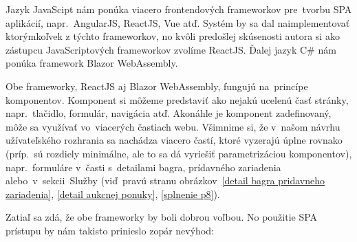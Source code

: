 Jazyk JavaScipt nám ponúka viacero frontendových frameworkov pre~tvorbu SPA aplikácií, napr.~AngularJS, ReactJS, Vue atď. Systém by sa dal naimplementovať ktorýmkoľvek z týchto frameworkov, no kvôli predošlej skúsenosti autora si ako zástupcu JavaScriptových frameworkov zvolíme ReactJS. Ďalej jazyk C\# nám ponúka framework Blazor WebAssembly.

Obe frameworky, ReactJS aj Blazor WebAssembly, fungujú na~princípe komponentov. Komponent si môžeme predstaviť ako nejakú ucelenú časť stránky, napr.~tlačidlo, formulár, navigácia atď. Akonáhle je komponent zadefinovaný, môže sa využívať vo~viacerých častiach webu. Všimnime si, že v~našom návrhu užívateľského rozhrania sa nachádza viacero častí, ktoré vyzerajú úplne rovnako (príp.~sú rozdiely minimálne, ale to sa dá vyriešiť parametrizáciou komponentov), napr.~formuláre v~časti s~detailami bagra, prídavného zariadenia alebo~v~sekcii~Služby (viď~pravú stranu obrázkov~\ref{detail bagra pridavneho zariadenia}, \ref{detail aukcnej ponuky}, \ref{splnenie p8}).

Zatiaľ sa zdá, že obe frameworky by boli dobrou voľbou. No použitie SPA prístupu by nám takisto prinieslo zopár nevýhod:

